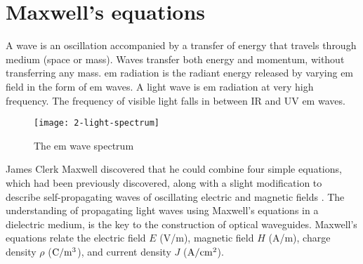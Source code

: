 \documentclass[../report.tex]{subfiles}
\begin{document}
	\section{Maxwell's equations}
A wave is an oscillation accompanied by a transfer of energy that travels through medium (space or mass). Waves transfer both energy and momentum, without transferring any mass. \gls{em} radiation is the radiant energy released by varying \gls{em} field in the form of \gls{em} waves. A light wave is \gls{em} radiation at very high frequency. The frequency of visible light falls in between IR and UV \gls{em} waves.
\begin{figure}[h]
	\centering
	\texttt{[image: 2-light-spectrum]}
	\caption{The \gls{em} wave spectrum}
	\label{fig:2_light_spectrum}
\end{figure}
James Clerk Maxwell discovered that he could combine four simple equations, which had been previously discovered, along with a slight modification to describe self-propagating waves of oscillating electric and magnetic fields \cite{waveparticle_2016}. The understanding of propagating light waves using Maxwell's equations in a dielectric medium, is the key to the construction of optical waveguides. Maxwell’s equations relate the electric field $E$ (V/m), magnetic field $H$ (A/m), charge density $\rho$ ($\mathrm{C/m^3}$), and current density $J$ ($\mathrm{A/cm^2}$).
\end{document}
